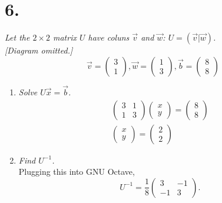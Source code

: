 \documentclass[12pt]{article}
\begin{document}
\section*{6.}
\textit{Let the $2 \times 2$ matrix $U$ have coluns $\vec{v}$ and $\vec{w}$:
$U = (\vec{v} | \vec{w})$. \\ {[Diagram omitted.]}}
\begin{equation*}
	\vec{v} = \begin{pmatrix} 3 \\ 1 \end{pmatrix}
	,
	\vec{w} = \begin{pmatrix} 1 \\ 3 \end{pmatrix}
	,
	\vec{b} = \begin{pmatrix} 8 \\ 8 \end{pmatrix}
\end{equation*}
\begin{enumerate}[label=(\alph*)]
	\item \textit{Solve $U\vec{x} = \vec{b}$.}
	\begin{gather*}
		\begin{pmatrix}
			3 & 1 \\
			1 & 3
		\end{pmatrix}
		\begin{pmatrix} x \\ y \end{pmatrix}
		=
		\begin{pmatrix} 8 \\ 8 \end{pmatrix}
		\\
		\boxed{
			\begin{pmatrix} x \\ y \end{pmatrix}
			=
			\begin{pmatrix} 2 \\ 2 \end{pmatrix}
		}
	\end{gather*}
	
	\item \textit{Find $U^{-1}$.} \\[\baselineskip]
	Plugging this into GNU Octave,
	\begin{equation*}
		U^{-1} =
		\boxed{
			\frac{1}{8}
			\begin{pmatrix}
				3 & -1 \\
				-1 & 3
			\end{pmatrix}
		}
		.
	\end{equation*}
\end{enumerate}
\end{document}
